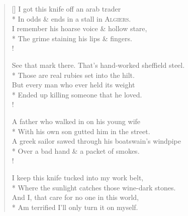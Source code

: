 \settowidth{\versewidth}{Where the sunlight catches those wine-dark stones.}
\begin{verse}[\versewidth]
I got this knife off an arab trader\\*
\vin In odds \& ends in a stall in \textsc{Algiers}.\\
I remember his hoarse voice \& hollow stare,\\*
\vin The grime staining his lips \& fingers.\\!

See that mark there. That's hand-worked sheffield steel.\\*
\vin Those are real rubies set into the hilt.\\
But every man who ever held its weight\\*
\vin Ended up killing someone that he loved.\\!

A father who walked in on his young wife\\*
\vin With his own son gutted him in the street.\\
A greek sailor sawed through his boatswain's windpipe\\*
\vin Over a bad hand \& a packet of smokes.\\!

I keep this knife tucked into my work belt,\\*
\vin Where the sunlight catches those wine-dark stones.\\
And I, that care for no one in this world,\\*
\vin Am terrified I'll only turn it on myself.
\end{verse}
